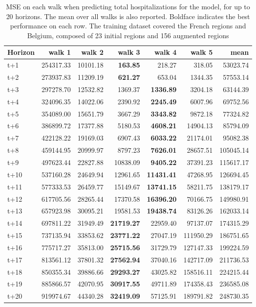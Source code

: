 \begin{table}[H]
\centering
\caption{MSE on each walk when predicting total hospitalizations for the model, for up to 20 horizons. The mean over all walks is also reported. Boldface indicates the best performance on each row. The training dataset covered the French regions and Belgium, composed of 23 initial regions and 156 augmented regions }
\label{tab:MSE_walk_baseline}
\begin{tabular}{lrrrrrr}
\toprule
Horizon &    walk 1 &   walk 2 &   walk 3 &   walk 4 &    walk 5 &      mean \\
\midrule
t+1  & 254317.33  & 10101.18  & \textbf{163.85}  & 218.27  & 318.05  & 53023.74  \\
t+2  & 273937.83  & 11209.19  & \textbf{621.27}  & 653.04  & 1344.35  & 57553.14  \\
t+3  & 297278.70  & 12532.82  & 1369.37  & \textbf{1336.89}  & 3204.18  & 63144.39  \\
t+4  & 324096.35  & 14022.06  & 2390.92  & \textbf{2245.49}  & 6007.96  & 69752.56  \\
t+5  & 354089.00  & 15651.79  & 3667.29  & \textbf{3343.82}  & 9872.18  & 77324.82  \\
t+6  & 386899.72  & 17377.88  & 5180.53  & \textbf{4608.21}  & 14904.13  & 85794.09  \\
t+7  & 422128.22  & 19169.03  & 6907.43  & \textbf{6033.22}  & 21174.01  & 95082.38  \\
t+8  & 459144.95  & 20999.97  & 8797.23  & \textbf{7626.01}  & 28657.51  & 105045.14  \\
t+9  & 497623.44  & 22827.88  & 10838.09  & \textbf{9405.22}  & 37391.23  & 115617.17  \\
t+10  & 537160.28  & 24649.94  & 12961.65  & \textbf{11431.41}  & 47268.95  & 126694.45  \\
t+11  & 577333.53  & 26459.77  & 15149.67  & \textbf{13741.15}  & 58211.75  & 138179.17  \\
t+12  & 617705.56  & 28265.44  & 17370.58  & \textbf{16396.20}  & 70166.75  & 149980.91  \\
t+13  & 657923.98  & 30095.21  & 19581.53  & \textbf{19438.74}  & 83126.26  & 162033.14  \\
t+14  & 697811.22  & 31949.49  & \textbf{21719.27}  & 22959.40  & 97137.07  & 174315.29  \\
t+15  & 737135.94  & 33853.62  & \textbf{23771.22}  & 27047.19  & 111950.29  & 186751.65  \\
t+16  & 775717.27  & 35813.00  & \textbf{25715.56}  & 31729.79  & 127147.33  & 199224.59  \\
t+17  & 813561.12  & 37801.32  & \textbf{27562.94}  & 37040.16  & 142717.09  & 211736.53  \\
t+18  & 850355.34  & 39886.66  & \textbf{29293.27}  & 43025.82  & 158516.11  & 224215.44  \\
t+19  & 885866.57  & 42070.95  & \textbf{30917.55}  & 49711.89  & 174358.43  & 236585.08  \\
t+20  & 919974.67  & 44340.28  & \textbf{32419.09}  & 57125.91  & 189791.82  & 248730.35  \\

\bottomrule
\end{tabular}
\end{table}
